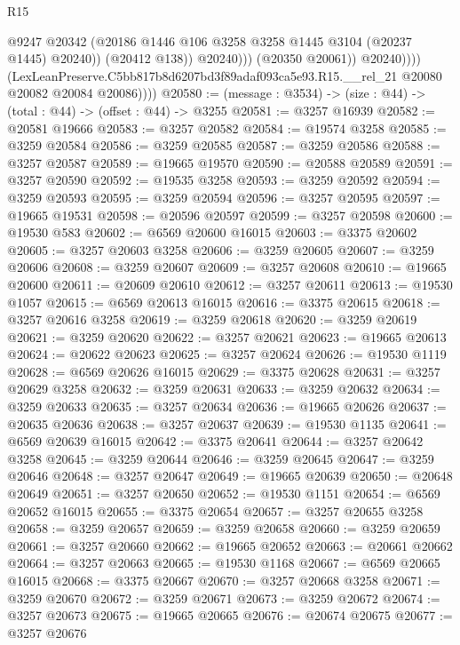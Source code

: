 \begin{lexlean}{R15}
\begin{coremodule}
                              @9247
                              @20342
                              (@20186 @1446 @106 @3258 @3258 @1445 @3104 (@20237 @1445) @20240))
                            (@20412 @138))
                          @20240)))
                    (@20350 @20061))
                  @20240))))
          (LexLeanPreserve.C5bb817b8d6207bd3f89adaf093ca5e93.R15.__rel_21
            @20080
            @20082
            @20084
            @20086))))
@20580 := (message : @3534) -> (size : @44) -> (total : @44) -> (offset : @44) -> @3255
@20581 := @3257 @16939
@20582 := @20581 @19666
@20583 := @3257 @20582
@20584 := @19574 @3258
@20585 := @3259 @20584
@20586 := @3259 @20585
@20587 := @3259 @20586
@20588 := @3257 @20587
@20589 := @19665 @19570
@20590 := @20588 @20589
@20591 := @3257 @20590
@20592 := @19535 @3258
@20593 := @3259 @20592
@20594 := @3259 @20593
@20595 := @3259 @20594
@20596 := @3257 @20595
@20597 := @19665 @19531
@20598 := @20596 @20597
@20599 := @3257 @20598
@20600 := @19530 @583
@20602 := @6569 @20600 @16015
@20603 := @3375 @20602
@20605 := @3257 @20603 @3258
@20606 := @3259 @20605
@20607 := @3259 @20606
@20608 := @3259 @20607
@20609 := @3257 @20608
@20610 := @19665 @20600
@20611 := @20609 @20610
@20612 := @3257 @20611
@20613 := @19530 @1057
@20615 := @6569 @20613 @16015
@20616 := @3375 @20615
@20618 := @3257 @20616 @3258
@20619 := @3259 @20618
@20620 := @3259 @20619
@20621 := @3259 @20620
@20622 := @3257 @20621
@20623 := @19665 @20613
@20624 := @20622 @20623
@20625 := @3257 @20624
@20626 := @19530 @1119
@20628 := @6569 @20626 @16015
@20629 := @3375 @20628
@20631 := @3257 @20629 @3258
@20632 := @3259 @20631
@20633 := @3259 @20632
@20634 := @3259 @20633
@20635 := @3257 @20634
@20636 := @19665 @20626
@20637 := @20635 @20636
@20638 := @3257 @20637
@20639 := @19530 @1135
@20641 := @6569 @20639 @16015
@20642 := @3375 @20641
@20644 := @3257 @20642 @3258
@20645 := @3259 @20644
@20646 := @3259 @20645
@20647 := @3259 @20646
@20648 := @3257 @20647
@20649 := @19665 @20639
@20650 := @20648 @20649
@20651 := @3257 @20650
@20652 := @19530 @1151
@20654 := @6569 @20652 @16015
@20655 := @3375 @20654
@20657 := @3257 @20655 @3258
@20658 := @3259 @20657
@20659 := @3259 @20658
@20660 := @3259 @20659
@20661 := @3257 @20660
@20662 := @19665 @20652
@20663 := @20661 @20662
@20664 := @3257 @20663
@20665 := @19530 @1168
@20667 := @6569 @20665 @16015
@20668 := @3375 @20667
@20670 := @3257 @20668 @3258
@20671 := @3259 @20670
@20672 := @3259 @20671
@20673 := @3259 @20672
@20674 := @3257 @20673
@20675 := @19665 @20665
@20676 := @20674 @20675
@20677 := @3257 @20676

\end{coremodule}
\end{lexlean}
